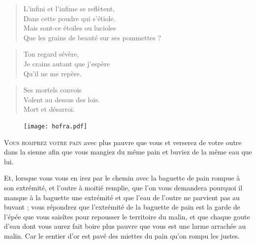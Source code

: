 \begin{verse}
  L’infini et l’infime se reflètent,\\  %
  Dans cette poudre qui s’étiole.\\  %
  Mais sont-ce étoiles ou lucioles\\  %
  Que les grains de beauté sur ses pommettes ?
\end{verse}

\begin{verse}\haiku
  Ton regard sévère,\\  %
  Je crains autant que j’espère\\  %
  Qu’il ne me repère.
\end{verse}


\begin{verse}\haiku
  Ses mortels convois\\
  Volent au dessus des lois.\\
  Mort et désarroi.
\end{verse}

\begin{figure}[h]
  \centering
  \texttt{[image: hofra.pdf]}
  \captionsetup{labelformat=empty}
  \caption[Idéotexte du  (\textarabic{حفره})]{}
\end{figure}

\lettrine[lines=3,slope=-.7em]{V}{ous romprez votre pain} avec plus pauvre que vous et verserez de votre outre dans la sienne afin que vous mangiez du même pain et buviez de la même eau que lui.

Et, lorsque vous vous en irez par le chemin avec la baguette de pain rompue à son extrémité, et l’outre à moitié remplie, que l’on vous demandera pourquoi il manque à la baguette une extrémité et que l’eau de l’outre ne parvient pas au buvant ; vous répondrez que l’extrémité de la baguette de pain est la garde de l’épée que vous saisîtes pour repousser le territoire du malin, et que chaque goute d’eau dont vous aurez fait boire plus pauvre que vous est une larme arrachée au malin.
Car le sentier d’or est pavé des miettes du pain qu’on rompu les justes.

